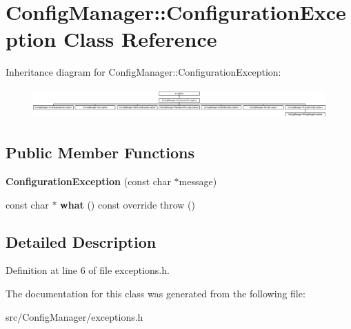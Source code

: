 \hypertarget{class_config_manager_1_1_configuration_exception}{}\section{Config\+Manager\+:\+:Configuration\+Exception Class Reference}
\label{class_config_manager_1_1_configuration_exception}
Inheritance diagram for Config\+Manager\+:\+:Configuration\+Exception\+:\begin{figure}[H]
\begin{center}
\leavevmode
\includegraphics[height=1.172161cm]{class_config_manager_1_1_configuration_exception}
\end{center}
\end{figure}
\subsection*{Public Member Functions}
\begin{DoxyCompactItemize}
\item 
{\bfseries Configuration\+Exception} (const char $\ast$message)\hypertarget{class_config_manager_1_1_configuration_exception_a7ab971ae1aa991968064f7414f233afd}{}\label{class_config_manager_1_1_configuration_exception_a7ab971ae1aa991968064f7414f233afd}

\item 
const char $\ast$ {\bfseries what} () const  override  throw ()\hypertarget{class_config_manager_1_1_configuration_exception_a2896099b9b4ced84a7359136105e9937}{}\label{class_config_manager_1_1_configuration_exception_a2896099b9b4ced84a7359136105e9937}

\end{DoxyCompactItemize}


\subsection{Detailed Description}


Definition at line 6 of file exceptions.\+h.



The documentation for this class was generated from the following file\+:\begin{DoxyCompactItemize}
\item 
src/\+Config\+Manager/exceptions.\+h\end{DoxyCompactItemize}
